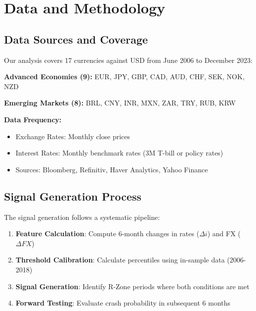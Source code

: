 \documentclass[twocolumn,ieee]{arithmaxresearch}
\begin{document}
\section{Data and Methodology}

\subsection{Data Sources and Coverage}

Our analysis covers 17 currencies against USD from June 2006 to December 2023:

\textbf{Advanced Economies (9):}
EUR, JPY, GBP, CAD, AUD, CHF, SEK, NOK, NZD

\textbf{Emerging Markets (8):}
BRL, CNY, INR, MXN, ZAR, TRY, RUB, KRW

\textbf{Data Frequency:}
\begin{itemize}
    \item Exchange Rates: Monthly close prices
    \item Interest Rates: Monthly benchmark rates (3M T-bill or policy rates)
    \item Sources: Bloomberg, Refinitiv, Haver Analytics, Yahoo Finance
\end{itemize}

\subsection{Signal Generation Process}

The signal generation follows a systematic pipeline:

\begin{enumerate}
    \item \textbf{Feature Calculation}: Compute 6-month changes in rates ($\Delta i$) and FX ($\Delta FX$)
    \item \textbf{Threshold Calibration}: Calculate percentiles using in-sample data (2006-2018)
    \item \textbf{Signal Generation}: Identify R-Zone periods where both conditions are met
    \item \textbf{Forward Testing}: Evaluate crash probability in subsequent 6 months
\end{enumerate}
\end{document}

